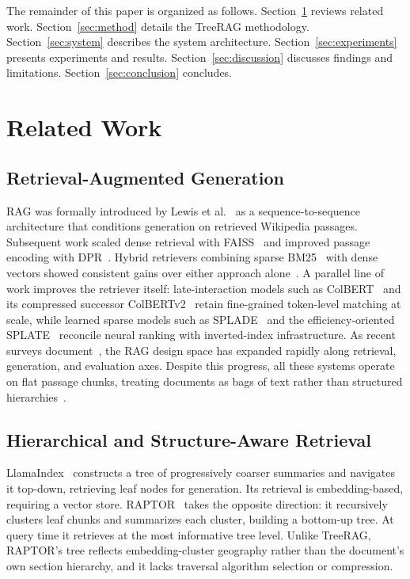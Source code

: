 \documentclass[sigconf,review,anonymous]{acmart}
\begin{document}
The remainder of this paper is organized as follows. Section~\ref{sec:related}
reviews related work. Section~\ref{sec:method} details the TreeRAG methodology.
Section~\ref{sec:system} describes the system architecture.
Section~\ref{sec:experiments} presents experiments and results.
Section~\ref{sec:discussion} discusses findings and limitations.
Section~\ref{sec:conclusion} concludes.

\section{Related Work}
\label{sec:related}

\subsection{Retrieval-Augmented Generation}
RAG was formally introduced by Lewis et al.~\cite{lewis2020rag} as a
sequence-to-sequence architecture that conditions generation on retrieved
Wikipedia passages. Subsequent work scaled dense retrieval with
FAISS~\cite{johnson2019faiss} and improved passage encoding with
DPR~\cite{karpukhin2020dpr}. Hybrid retrievers combining sparse
BM25~\cite{robertson2009bm25} with dense vectors showed consistent gains over
either approach alone~\cite{ma2021replication}. A parallel line of work improves
the retriever itself: late-interaction models such as
ColBERT~\cite{khattab2020colbert} and its compressed successor
ColBERTv2~\cite{santhanam2022colbertv2} retain fine-grained token-level matching
at scale, while learned sparse models such as SPLADE~\cite{formal2021splade} and
the efficiency-oriented SPLATE~\cite{formal2024splate} reconcile neural ranking
with inverted-index infrastructure. As recent surveys
document~\cite{gao2024survey,gupta2024survey}, the RAG design space has expanded
rapidly along retrieval, generation, and evaluation axes. Despite this progress,
all these systems operate on flat passage chunks, treating documents as bags of
text rather than structured hierarchies~\cite{gao2024survey}.

\subsection{Hierarchical and Structure-Aware Retrieval}
LlamaIndex~\cite{liu2022llamaindex} constructs a tree of progressively coarser
summaries and navigates it top-down, retrieving leaf nodes for generation. Its
retrieval is embedding-based, requiring a vector store.
RAPTOR~\cite{sarthi2024raptor} takes the opposite direction: it recursively
clusters leaf chunks and summarizes each cluster, building a bottom-up tree. At
query time it retrieves at the most informative tree level. Unlike TreeRAG,
RAPTOR's tree reflects embedding-cluster geography rather than the document's own
section hierarchy, and it lacks traversal algorithm selection or compression.
\end{document}
